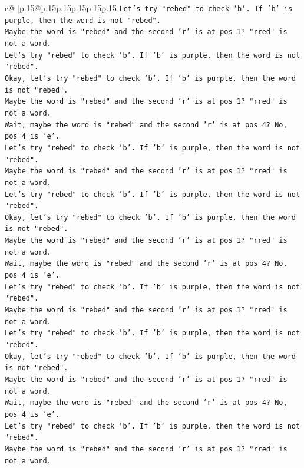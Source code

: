 \documentclass{article}
\begin{document}
{\begin{supertabular}{c@{$\;$}|p{.15\linewidth}@{}p{.15\linewidth}p{.15\linewidth}p{.15\linewidth}p{.15\linewidth}p{.15\linewidth}}
{{{\texttt{Let's try "rebed" to check 'b'. If 'b' is purple, then the word is not "rebed".} \\
\texttt{Maybe the word is "rebed" and the second 'r' is at pos 1? "rred" is not a word.} \\
\texttt{Let's try "rebed" to check 'b'. If 'b' is purple, then the word is not "rebed".} \\
\texttt{Okay, let's try "rebed" to check 'b'. If 'b' is purple, then the word is not "rebed".} \\
\texttt{Maybe the word is "rebed" and the second 'r' is at pos 1? "rred" is not a word.} \\
\texttt{Wait, maybe the word is "rebed" and the second 'r' is at pos 4? No, pos 4 is 'e'.} \\
\texttt{Let's try "rebed" to check 'b'. If 'b' is purple, then the word is not "rebed".} \\
\texttt{Maybe the word is "rebed" and the second 'r' is at pos 1? "rred" is not a word.} \\
\texttt{Let's try "rebed" to check 'b'. If 'b' is purple, then the word is not "rebed".} \\
\texttt{Okay, let's try "rebed" to check 'b'. If 'b' is purple, then the word is not "rebed".} \\
\texttt{Maybe the word is "rebed" and the second 'r' is at pos 1? "rred" is not a word.} \\
\texttt{Wait, maybe the word is "rebed" and the second 'r' is at pos 4? No, pos 4 is 'e'.} \\
\texttt{Let's try "rebed" to check 'b'. If 'b' is purple, then the word is not "rebed".} \\
\texttt{Maybe the word is "rebed" and the second 'r' is at pos 1? "rred" is not a word.} \\
\texttt{Let's try "rebed" to check 'b'. If 'b' is purple, then the word is not "rebed".} \\
\texttt{Okay, let's try "rebed" to check 'b'. If 'b' is purple, then the word is not "rebed".} \\
\texttt{Maybe the word is "rebed" and the second 'r' is at pos 1? "rred" is not a word.} \\
\texttt{Wait, maybe the word is "rebed" and the second 'r' is at pos 4? No, pos 4 is 'e'.} \\
\texttt{Let's try "rebed" to check 'b'. If 'b' is purple, then the word is not "rebed".} \\
\texttt{Maybe the word is "rebed" and the second 'r' is at pos 1? "rred" is not a word.} \\
}}}
\end{supertabular}}
\end{document}

